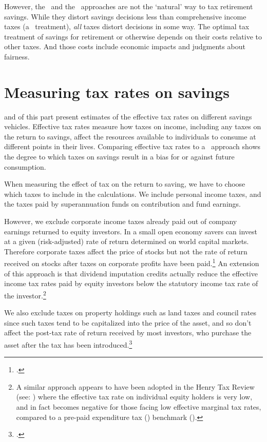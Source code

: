 \begin{subappendices}
However, the \EET\ and the \TEE\ approaches are not the ‘natural’ way to tax retirement savings. While they distort savings decisions less than comprehensive income taxes (a \TTE\ treatment), \emph{all} taxes distort decisions in some way. The optimal tax treatment of savings for retirement or otherwise depends on their costs relative to other taxes. And those costs include economic impacts and judgments about fairness.

\section{Measuring tax rates on savings}\label{appendix:SUPER-C-2}
 and  of this part present estimates of the effective tax rates on different savings vehicles. Effective tax rates measure how taxes on income, including any taxes on the return to savings, affect the resources available to individuals to consume at different points in their lives. Comparing effective tax rates to a \TEE\ approach shows the degree to which taxes on savings result in a bias for or against future consumption.

When measuring the effect of tax on the return to saving, we have to choose which taxes to include in the calculations. We include personal income taxes, and the taxes paid by superannuation funds on contribution and fund earnings. 

However, we exclude corporate income taxes already paid out of company earnings returned to equity investors. In a small open economy savers can invest at a given (risk-adjusted) rate of return determined on world capital markets. Therefore corporate taxes affect the price of stocks but not the rate of return received on stocks after taxes on corporate profits have been paid.\footcite[][7]{Wakefield2009}  An extension of this approach is that dividend imputation credits actually reduce the effective income tax rates paid by equity investors below the statutory income tax rate of the investor.\footnote{A similar approach appears to have been adopted in the Henry Tax Review (see: \textcite[][Figure~A1-19]{HenryTaxReview2010}) where the effective tax rate on individual equity holders is very low, and in fact becomes negative for those facing low effective marginal tax rates, compared to a pre-paid expenditure tax (\TEE) benchmark (\textcite[][67]{HenryTaxReview2010}).}  

We also exclude taxes on property holdings such as land taxes and council rates since such taxes tend to be capitalized into the price of the asset, and so don’t affect the post-tax rate of return received by most investors, who purchase the asset after the tax has been introduced.\footcite{DaleyCoates2015PropertyTaxes}  


\end{subappendices}